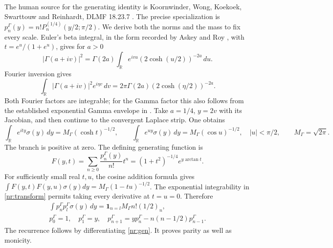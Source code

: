 \documentclass[11pt]{article}
\newcommand{\R}{\mathbb R}
\begin{document}
The human source for the generating identity is
Koornwinder, Wong, Koekoek, Swarttouw and Reinhardt,
DLMF 18.23.7 \cite{DLMF18}. The precise specialization is
$p_n^\Gamma(y)=n!P_n^{(1/4)}(y/2;\pi/2)$.
We derive both the norms and the mass to fix every scale.
Euler's beta integral, in the form recorded by Askey and Roy
\cite{DLMF5}, with $t=e^u/(1+e^u)$, gives for $a>0$
\[
 |\Gamma(a+iv)|^2
 =\Gamma(2a)\int_\R e^{ivu}(2\cosh(u/2))^{-2a}\,du.
\]
Fourier inversion gives
\[
 \int_\R|\Gamma(a+iv)|^2e^{i\eta v}\,dv
 =2\pi\Gamma(2a)(2\cosh(\eta/2))^{-2a}.
\]
Both Fourier factors are integrable; for the Gamma factor this also
follows from the established exponential Gamma envelope in \cite{NP}.
Take $a=1/4$, $y=2v$ with its Jacobian, and then continue to the
convergent Laplace strip. One obtains
\begin{equation}\tag{NR8}\label{nr:transform}
 \int_\R e^{ity}\sigma(y)\,dy
 =M_\Gamma(\cosh t)^{-1/2},\qquad
 \int_\R e^{uy}\sigma(y)\,dy=M_\Gamma(\cos u)^{-1/2},\quad |u|<\pi/2,
 \qquad M_\Gamma=\sqrt{2\pi}.
\end{equation}
The branch is positive at zero. The defining generating function is
\begin{equation}\tag{NR9}\label{nr:gen}
 F(y,t)=\sum_{n\ge0}\frac{p_n^\Gamma(y)}{n!}t^n
       =(1+t^2)^{-1/4}e^{y\arctan t}.
\end{equation}
For sufficiently small real $t,u$, the cosine addition formula gives
$\int F(y,t)F(y,u)\sigma(y)dy=M_\Gamma(1-tu)^{-1/2}$.
The exponential integrability in \eqref{nr:transform} permits taking
every derivative at $t=u=0$. Therefore
\begin{equation}\tag{NR10}\label{nr:normrec}
 \begin{gathered}
 \int p_n^\Gamma p_l^\Gamma\sigma(y)\,dy
 =\mathbf1_{n=l}M_\Gamma n!(1/2)_n,\\
 p_0^\Gamma=1,\quad p_1^\Gamma=y,\quad
 p_{n+1}^\Gamma=yp_n^\Gamma-n(n-1/2)p_{n-1}^\Gamma.
 \end{gathered}
\end{equation}
The recurrence follows by differentiating \eqref{nr:gen}. It proves
parity as well as monicity.
\end{document}
